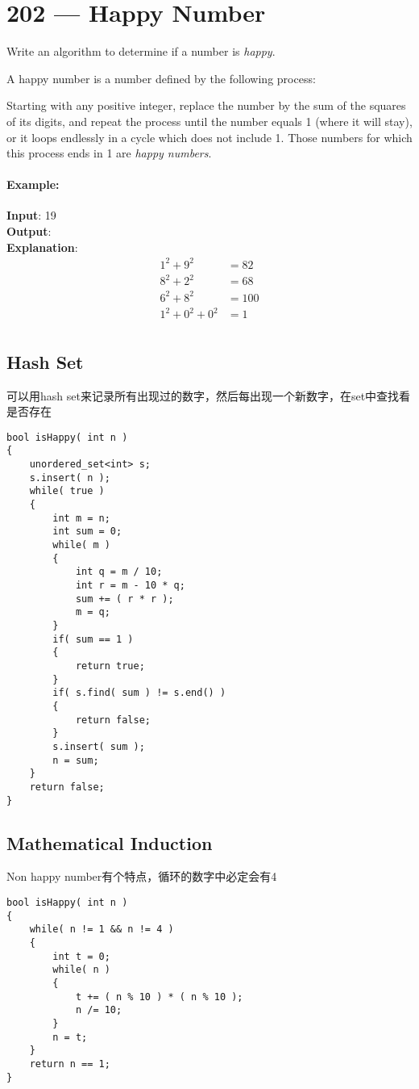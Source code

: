 \section{202 --- Happy Number}
Write an algorithm to determine if a number is \textit{happy}.
\par
A happy number is a number defined by the following process: 
\par
Starting with any positive integer, replace the number by the sum of the squares of its digits, and repeat the process until the number equals 1 (where it will stay), or it loops endlessly in a cycle which does not include 1. Those numbers for which this process ends in 1 are \textit{happy numbers}.
\paragraph{Example: }
\begin{flushleft}

\textbf{Input}: 19
\\
\textbf{Output}: 
\\
\textbf{Explanation}: 
\begin{align*}
1^2 + 9^2 &= 82\\
8^2 + 2^2 &= 68\\
6^2 + 8^2 &= 100\\
1^2 + 0^2 + 0^2 &= 1\\
\end{align*}
\end{flushleft}
\subsection{Hash Set}
可以用hash set来记录所有出现过的数字，然后每出现一个新数字，在set中查找看是否存在
\setcounter{lstlisting}{0}
\begin{lstlisting}[style=customc, caption={Hash Set}]
bool isHappy( int n )
{
    unordered_set<int> s;
    s.insert( n );
    while( true )
    {
        int m = n;
        int sum = 0;
        while( m )
        {
            int q = m / 10;
            int r = m - 10 * q;
            sum += ( r * r );
            m = q;
        }
        if( sum == 1 )
        {
            return true;
        }
        if( s.find( sum ) != s.end() )
        {
            return false;
        }
        s.insert( sum );
        n = sum;
    }
    return false;
}

\end{lstlisting}
\subsection{Mathematical Induction}
Non happy number有个特点，循环的数字中必定会有4
\begin{lstlisting}[style=customc, caption={Mathematical Induction}]
bool isHappy( int n )
{
    while( n != 1 && n != 4 )
    {
        int t = 0;
        while( n )
        {
            t += ( n % 10 ) * ( n % 10 );
            n /= 10;
        }
        n = t;
    }
    return n == 1;
}
\end{lstlisting}